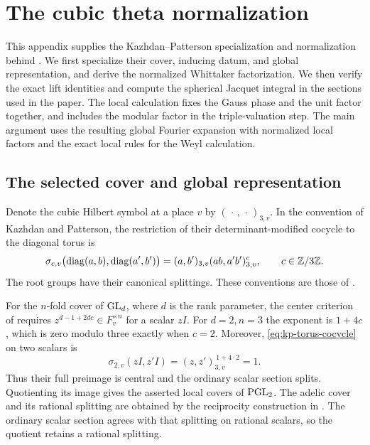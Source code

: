 \section{The cubic theta normalization}
\label{app:whittaker}

This appendix supplies the Kazhdan--Patterson specialization and
normalization behind .  We first specialize their
cover, inducing datum, and global representation, and derive the normalized
Whittaker factorization.  We then verify the exact lift identities and
compute the spherical Jacquet integral in the sections used in the paper.
The local calculation fixes the Gauss phase and the unit factor together,
and includes the modular factor in the triple-valuation step.  The main
argument uses the resulting global Fourier expansion with normalized local
factors and the exact local rules for the Weyl calculation.

\subsection{The selected cover and global representation}
\label{subsec:theta-specialization}

Denote the cubic Hilbert symbol at a place \(v\) by
\((\,\cdot\,,\,\cdot\,)_{3,v}\).  In the convention of Kazhdan and
Patterson, the restriction of their determinant-modified cocycle to the
diagonal torus is
\begin{equation}\label{eq:kp-torus-cocycle}
 \sigma_{c,v}\bigl(\operatorname{diag}(a,b),
                    \operatorname{diag}(a',b')\bigr)
 =(a,b')_{3,v}(ab,a'b')_{3,v}^{c},
 \qquad c\in\mathbb{Z}/3\mathbb{Z}.
\end{equation}
The root groups have their canonical splittings.  These conventions are
those of \cite[Section~0.1, pp.~39--44]{KP84}.

For the \(n\)-fold cover of \(\mathrm{GL}_d\), where \(d\) is the rank parameter,
the center criterion of \cite[Proposition~0.1.1, p.~42]{KP84} requires
\(z^{d-1+2dc}\in F_v^{\times n}\) for a scalar \(zI\).  For \(d=2,n=3\)
the exponent is \(1+4c\), which is zero modulo three exactly when \(c=2\).
Moreover, \eqref{eq:kp-torus-cocycle} on two scalars is
\[
 \sigma_{2,v}(zI,z'I)=(z,z')_{3,v}^{\,1+4\cdot2}=1.
\]
Thus their full preimage is central and the ordinary scalar section splits.
Quotienting its image gives the asserted local covers of \(\mathrm{PGL}_2\).
The adelic cover and its rational splitting are obtained by the reciprocity
construction in \cite[Section~0.2]{KP84}.  The ordinary scalar section
agrees with that splitting on rational scalars, so the quotient retains a
rational splitting.


